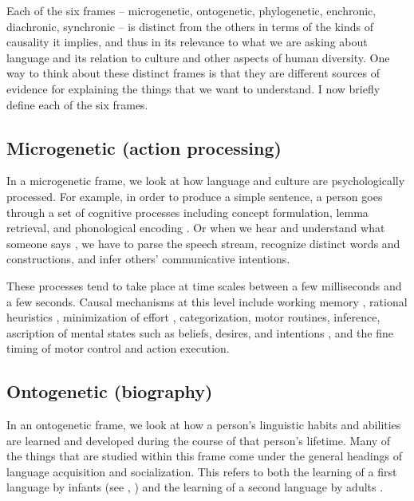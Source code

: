 Each of the six frames -- microgenetic, ontogenetic, phylogenetic, 
enchronic, diachronic, synchronic -- is distinct from the others in terms 
of the kinds of causality it implies, and thus in its relevance to what 
we are asking about language and its relation to culture and other 
aspects of human diversity. One way to think about these distinct frames 
is that they are different sources of evidence for explaining the things 
that we want to understand. I now briefly define each of the six frames.



\subsection{Microgenetic (action processing)}


In a microgenetic frame, we look at how language and culture are psychologically processed. For example, in order to produce a simple sentence, a person goes through a set of 
cognitive processes including concept formulation, lemma retrieval, and phonological 
encoding \citep{levelt_speaking:_1989}. Or when we hear and understand what someone says \citep{cutler_native_2012}, we have to parse the 
speech stream, recognize distinct words and constructions, and infer 
others' communicative intentions. 

These processes tend to take place at time scales between a few 
milliseconds and a few seconds. Causal mechanisms at this 
level include working memory \citep{baddeley_working_1986}, rational 
heuristics \citep{gigerenzer_heuristics:_2011}, minimization of
effort \citep{zipf_human_1949}, categorization, motor routines, 
inference, ascription of mental states such as beliefs, 
desires, and intentions \citep{searle_intentionality:_1983,enfield_roots_2006}, and 
the fine timing of motor control and action execution.



\subsection{Ontogenetic (biography)}


In an ontogenetic frame, we look at how a 
person's linguistic habits and abilities are learned and
developed during the course of that person's lifetime. Many of the 
things that are studied within this frame come under the general 
headings of language acquisition and socialization. This refers to both
the learning of a first language by infants (see \citealt{clark_first_2009}, \citealt{brown_language_2014}) and the learning of a second 
language by adults \citep{klein_second_1986}. 



